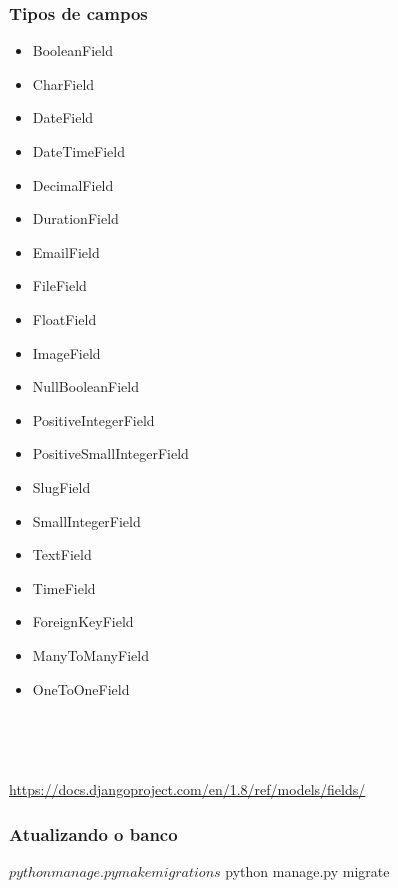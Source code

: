 \documentclass[aspectratio=169]{beamer}
\begin{document}
\begin{frame}[fragile]\frametitle{Tipos de campos}

\begin{minipage}[t]{.45\linewidth}
	\begin{itemize}
		\item BooleanField
		\item CharField
		\item DateField
		\item DateTimeField
		\item DecimalField
		\item DurationField
		\item EmailField
		\item FileField
		\item FloatField
		\item ImageField
	\end{itemize}
\end{minipage}
\begin{minipage}[t]{.45\linewidth}
	\begin{itemize}
		\item NullBooleanField
		\item PositiveIntegerField
		\item PositiveSmallIntegerField
		\item SlugField
		\item SmallIntegerField
		\item TextField
		\item TimeField
		\item ForeignKeyField
		\item ManyToManyField
		\item OneToOneField
	\end{itemize}
\end{minipage}

\

\

\url{https://docs.djangoproject.com/en/1.8/ref/models/fields/}

\end{frame}

\begin{frame}[fragile]\frametitle{Atualizando o banco}

\begin{bashcode}
	$ python manage.py makemigrations
	$ python manage.py migrate
\end{bashcode}

\end{frame}
\end{document}
